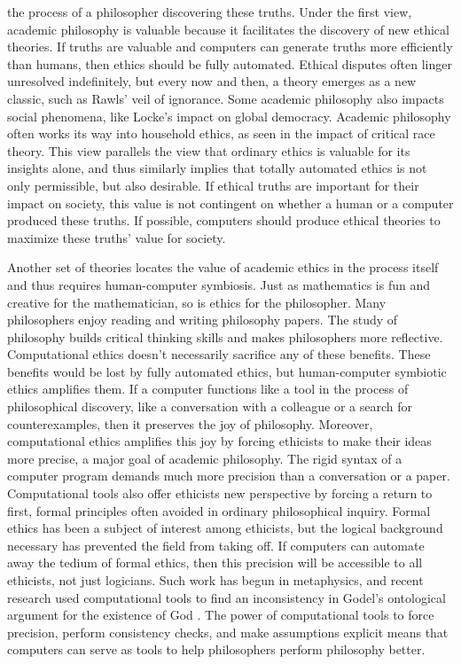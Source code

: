 \begin{isabellebody}
\begin{isamarkuptext}
the process of a philosopher discovering these truths. Under the first view, academic philosophy is 
valuable because it facilitates the discovery of new ethical theories. If truths are valuable and 
computers can generate truths more efficiently than humans, then ethics should be fully automated. 
Ethical disputes often linger unresolved indefinitely, but every now and then, 
a theory emerges as a new classic, such as Rawls’ veil of ignorance. Some academic philosophy also 
impacts social phenomena, like Locke’s impact on global democracy. Academic philosophy often works its 
way into household ethics, as seen in the impact of critical race theory. This view parallels the 
view that ordinary ethics is valuable for its insights alone, and thus
similarly implies that totally automated ethics is not only permissible, but also desirable. If 
ethical truths are important for their impact on society, this value is not contingent on whether a 
human or a computer produced these truths. If possible, computers should produce ethical theories 
to maximize these truths’ value for society. 

Another set of theories locates the value of academic ethics in the process itself and thus requires 
human-computer symbiosis. Just as mathematics is fun and creative for the mathematician, so is ethics 
for the philosopher. Many philosophers enjoy reading and writing philosophy papers. The study of 
philosophy builds critical thinking skills and makes philosophers more reflective. Computational ethics 
doesn’t necessarily sacrifice any of these benefits. These 
benefits would be lost by fully automated ethics, but human-computer symbiotic ethics amplifies them. 
If a computer functions like a tool in the process of philosophical discovery, like a conversation 
with a colleague or a search for counterexamples, then it preserves the joy of philosophy. Moreover, 
computational ethics amplifies this joy by forcing ethicists to make their ideas more precise, a major 
goal of academic philosophy. The rigid syntax of a computer program demands much more precision than a 
conversation or a paper. Computational tools also offer ethicists new perspective by forcing a return to 
first, formal principles often avoided in ordinary philosophical inquiry. Formal ethics has been a 
subject of interest among ethicists, but the logical background necessary has prevented the field 
from taking off. If computers can automate away the tedium of formal ethics, then this precision 
will be accessible to all ethicists, not just logicians. Such work has begun in metaphysics, and 
recent research used computational tools to find an inconsistency in Godel’s ontological argument 
for the existence of God \citep{godelincon}. The power of computational tools to force precision, perform 
consistency checks, and make assumptions explicit means that computers can serve as tools to 
help philosophers perform philosophy better.


\end{isamarkuptext}
\end{isabellebody}

